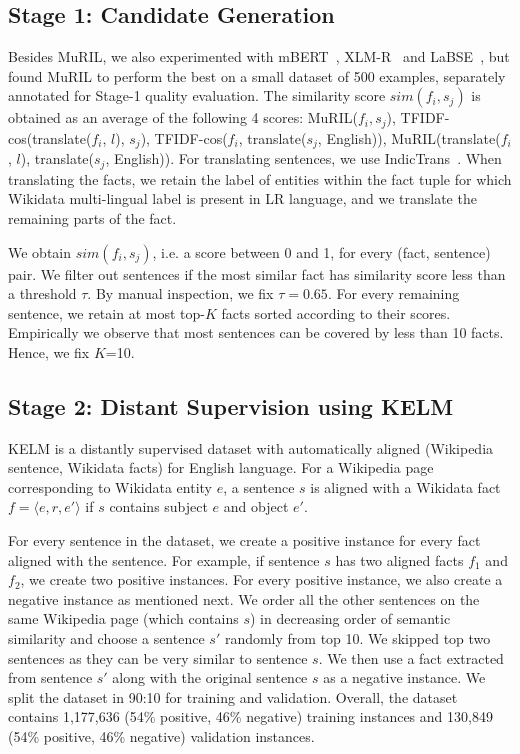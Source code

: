 \documentclass[11pt]{article}
\begin{document}
\subsection{Stage 1: Candidate Generation}
Besides MuRIL, we also experimented with mBERT~\cite{devlin2019bert}, XLM-R~\cite{conneau2020unsupervised} and LaBSE~\cite{feng2020language}, but found MuRIL to perform the best on a small dataset of 500 examples, separately annotated for Stage-1 quality evaluation. The similarity score $sim(f_i,s_j)$ is  obtained as an average of the following 4 scores: MuRIL($f_i,s_j$), TFIDF-cos(translate($f_i$, $l$), $s_j$), TFIDF-cos($f_i$, translate($s_j$, English)), MuRIL(translate($f_i$, $l$), translate($s_j$, English)). For translating sentences, we use IndicTrans~\cite{ramesh2021samanantar}. When translating the facts, we retain the label of entities within the fact tuple for which Wikidata multi-lingual label is present in LR language, and we translate the remaining parts of the fact. 

We obtain $sim(f_i,s_j)$, i.e. a score between 0 and 1, for every (fact, sentence) pair. We filter out sentences if the most similar fact has similarity score less than a threshold $\tau$. By manual inspection, we fix $\tau=0.65$. For every remaining sentence, we retain at most top-$K$ facts sorted according to their scores. Empirically we observe that most sentences can be covered by less than 10 facts. Hence, we fix $K$=10. 

\subsection{Stage 2: Distant Supervision using KELM}
KELM is a distantly supervised dataset with automatically aligned (Wikipedia sentence, Wikidata facts) for English language. For a Wikipedia page corresponding to Wikidata entity $e$, a sentence $s$ is aligned with a Wikidata fact $f=\langle e, r, e'\rangle$ if $s$ contains subject $e$ and object $e'$.  

For every sentence in the dataset, we create a positive instance for every fact aligned with the sentence. For example, if sentence $s$ has two aligned facts $f_1$ and $f_2$, we create two positive instances. For every positive instance, we also create a negative instance as mentioned next. We order all the other sentences on the same Wikipedia page (which contains $s$) in decreasing order of semantic similarity and choose a sentence $s'$ randomly from top 10. We skipped top two sentences as they can be very similar to sentence $s$. We then use a fact extracted from sentence $s'$ along with the original sentence $s$ as a negative instance. We split the dataset in 90:10 for training and validation. Overall, the dataset contains 1,177,636 (54\% positive, 46\% negative) training instances and 130,849 (54\% positive, 46\% negative) validation instances.
\end{document}
